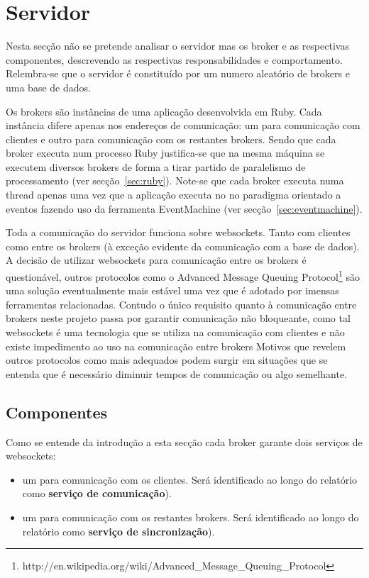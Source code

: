 \section{Servidor}

Nesta secção não se pretende analisar o servidor mas os broker e as respectivas componentes, descrevendo as respectivas responsabilidades e comportamento.
Relembra-se que o servidor é constituído por um numero aleatório de brokers e uma base de dados.

Os brokers são instâncias de uma aplicação desenvolvida em Ruby. Cada instância difere apenas nos endereços de comunicação: um para comunicação com clientes e outro para comunicação com os restantes brokers.
Sendo que cada broker executa num processo Ruby justifica-se que na mesma máquina se executem diversos brokers de forma a tirar partido de paralelismo de processamento (ver secção~\ref{sec:ruby}).
Note-se que cada broker executa numa thread apenas uma vez que a aplicação executa no no paradigma orientado a eventos fazendo uso da ferramenta EventMachine (ver secção~\ref{sec:eventmachine}).

Toda a comunicação do servidor funciona sobre websockets. Tanto com clientes como entre os brokers (à exceção evidente da comunicação com a base de dados). A decisão de utilizar websockets para comunicação entre os brokers é questionável, outros protocolos como o Advanced Message Queuing Protocol\footnote{http://en.wikipedia.org/wiki/Advanced\_Message\_Queuing\_Protocol} são uma solução eventualmente mais estável uma vez que é adotado por imensas ferramentas relacionadas.
Contudo o único requisito quanto à comunicação entre brokers neste projeto passa por garantir comunicação não bloqueante, como tal websockets é uma tecnologia que se utiliza na comunicação com clientes e não existe impedimento ao uso na comunicação entre brokers Motivos que revelem outros protocolos como mais adequados podem surgir em situações que se entenda que é necessário diminuir tempos de comunicação ou algo semelhante.

\subsection{Componentes}
Como se entende da introdução a esta secção cada broker garante dois serviços de websockets:

\begin{itemize}
\item um para comunicação com os clientes. Será identificado ao longo do relatório como \textbf{serviço de comunicação}).
\item um para comunicação com os restantes brokers. Será identificado ao longo do relatório como \textbf{serviço de sincronização}).
\end{itemize}

